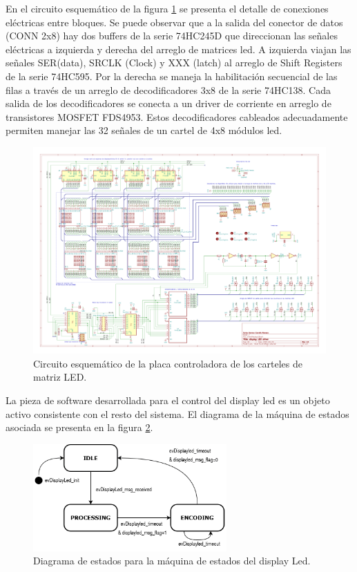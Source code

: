 En el circuito esquemático de la figura \ref{fig:schDriverLED} se presenta el detalle de conexiones eléctricas entre bloques. Se puede observar que a la salida del conector de datos (CONN 2x8) hay dos buffers de la serie 74HC245D que direccionan las señales eléctricas a izquierda y derecha del arreglo de matrices led. A izquierda viajan las señales SER(data), SRCLK (Clock) y XXX (latch) al arreglo de Shift Registers de la serie 74HC595. Por la derecha se maneja la habilitación secuencial de las filas a través de un arreglo de decodificadores 3x8 de la serie 74HC138. Cada salida de los decodificadores se conecta a un driver de corriente en arreglo de transistores MOSFET FDS4953. Estos decodificadores cableados adecuadamente permiten manejar las 32 señales de un cartel de 4x8 módulos led. \\


\begin{figure}[ht]
	\centering
	\includegraphics[width=1.66\textwidth, angle=90]{./Figures/output.driverLED.pdf}
	\caption{Circuito esquemático de la placa controladora de los carteles de matriz LED.}
	\label{fig:schDriverLED}
\end{figure}

La pieza de software desarrollada para el control del display led es un objeto activo consistente con el resto del sistema. El diagrama de la máquina de estados asociada se presenta en la figura \ref{fig:fsmDisplayLED}. \\

\begin{figure}[ht]
	\centering
	\includegraphics[width=0.66\textwidth]{./Figures/FSMdisplayLed.png}
	\caption{Diagrama de estados para la máquina de estados del display Led.}
	\label{fig:fsmDisplayLED}
\end{figure}


